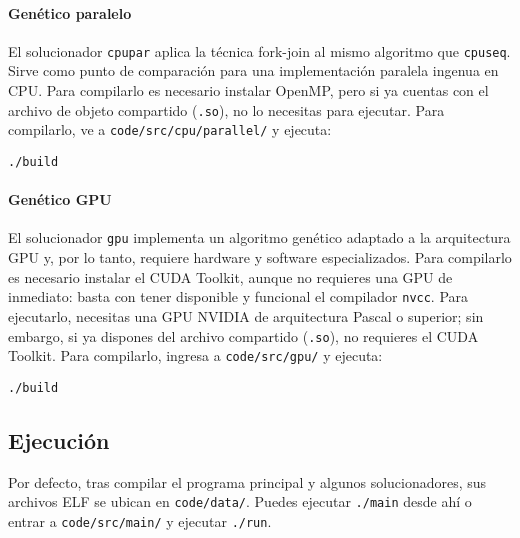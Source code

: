 \documentclass[main.tex]{subfiles}
\begin{document}
\begin{mdframed}[linewidth=2pt]
\paragraph{Genético paralelo}
El solucionador \texttt{cpupar} aplica la técnica fork-join al mismo algoritmo que \texttt{cpuseq}. Sirve como punto de comparación para una implementación paralela ingenua en CPU. Para compilarlo es necesario instalar OpenMP, pero si ya cuentas con el archivo de objeto compartido (\texttt{.so}), no lo necesitas para ejecutar.  
Para compilarlo, ve a \texttt{code/src/cpu/parallel/} y ejecuta:
\begin{verbatim}
./build
\end{verbatim}

\paragraph{Genético GPU}
El solucionador \texttt{gpu} implementa un algoritmo genético adaptado a la arquitectura GPU y, por lo tanto, requiere hardware y software especializados. Para compilarlo es necesario instalar el CUDA Toolkit, aunque no requieres una GPU de inmediato: basta con tener disponible y funcional el compilador \texttt{nvcc}. Para ejecutarlo, necesitas una GPU NVIDIA de arquitectura Pascal o superior; sin embargo, si ya dispones del archivo compartido (\texttt{.so}), no requieres el CUDA Toolkit.  
Para compilarlo, ingresa a \texttt{code/src/gpu/} y ejecuta:
\begin{verbatim}
./build
\end{verbatim}

\subsection*{Ejecución}
Por defecto, tras compilar el programa principal y algunos solucionadores, sus archivos ELF se ubican en \texttt{code/data/}. Puedes ejecutar \texttt{./main} desde ahí o entrar a \texttt{code/src/main/} y ejecutar \texttt{./run}.  


\end{mdframed}
\end{document}
